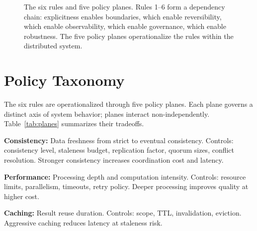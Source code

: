 \documentclass[conference]{IEEEtran}
\begin{document}
\begin{figure}[t]
{
}

\caption{The six rules and five policy planes. Rules 1--6 form a dependency chain: explicitness enables boundaries, which enable reversibility, which enable observability, which enable governance, which enable robustness. The five policy planes operationalize the rules within the distributed system.}
\label{fig:rules}
\end{figure}

\section{Policy Taxonomy}
\label{sec:taxonomy}
The six rules are operationalized through five policy planes. Each plane governs a distinct axis of system behavior; planes interact non-independently. Table~\ref{tab:planes} summarizes their tradeoffs.


\textbf{Consistency:} Data freshness from strict to eventual consistency. Controls: consistency level, staleness budget, replication factor, quorum sizes, conflict resolution. Stronger consistency increases coordination cost and latency.


\textbf{Performance:} Processing depth and computation intensity. Controls: resource limits, parallelism, timeouts, retry policy. Deeper processing improves quality at higher cost.


\textbf{Caching:} Result reuse duration. Controls: scope, TTL, invalidation, eviction. Aggressive caching reduces latency at staleness risk.
\end{document}
